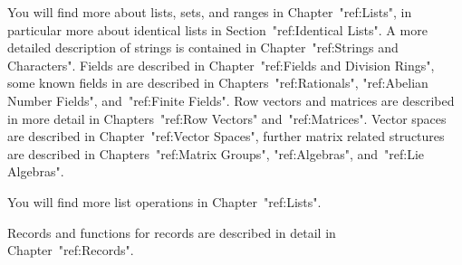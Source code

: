 % 
% 
You will find more about lists, sets, and ranges in Chapter~"ref:Lists",
in particular more about identical lists in Section~"ref:Identical Lists".
% 
% 
% 
A more detailed description of strings is contained in
Chapter~"ref:Strings and Characters".
% 
% 
Fields are described in Chapter~"ref:Fields and Division Rings",
some known fields in {\GAP} are described in Chapters~"ref:Rationals",
"ref:Abelian Number Fields", and~"ref:Finite Fields".
Row vectors and matrices are described in more detail
in Chapters~"ref:Row Vectors" and~"ref:Matrices".
Vector spaces are described in Chapter~"ref:Vector Spaces",
further matrix related structures are described in
Chapters~"ref:Matrix Groups", "ref:Algebras", and~"ref:Lie Algebras".
% 

% 
You will find more list operations in Chapter~"ref:Lists".

Records and functions for records are described in detail
in Chapter~"ref:Records".


